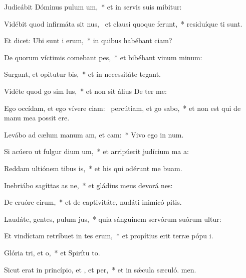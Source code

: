 \item Judicábit Dóminus pulum um,~* et in servis suis mibitur:
\item Vidébit quod infirmáta sit nus,~\pscross{} et clausi quoque ferunt,~* residuíque ti sunt.
\item Et dicet: Ubi sunt i erum,~* in quibus habébant ciam?
\item De quorum víctimis comebant pes,~* et bibébant vinum minum:
\item Surgant, et opitutur bis,~* et in necessitáte  tegant.
\item Vidéte quod go sim lus,~* et non sit álius De ter me:
\item Ego occídam, et ego vívere ciam:~\pscross{} percútiam, et go sabo,~* et non est qui de manu mea possit ere.
\item Levábo ad cælum manum am, et cam:~* Vivo ego in num.
\item Si acúero ut fulgur dium um,~* et arripúerit judícium ma a:
\item Reddam ultiónem tibus is,~* et his qui odérunt me buam.
\item Inebriábo sagíttas as ne,~* et gládius meus devorá nes:
\item De cruóre cirum,~* et de captivitáte, nudáti inimicó pitis.
\item Laudáte, gentes, pulum jus,~* quia sánguinem servórum suórum ultur:
\item Et vindíctam retríbuet in tes erum,~* et propítius erit terræ pópu i.
\item \singlecolsep
\item Glória tri, et o,~* et Spirítu to.
\item Sicut erat in princípio, et , et per,~* et in sǽcula sæculó. men.
